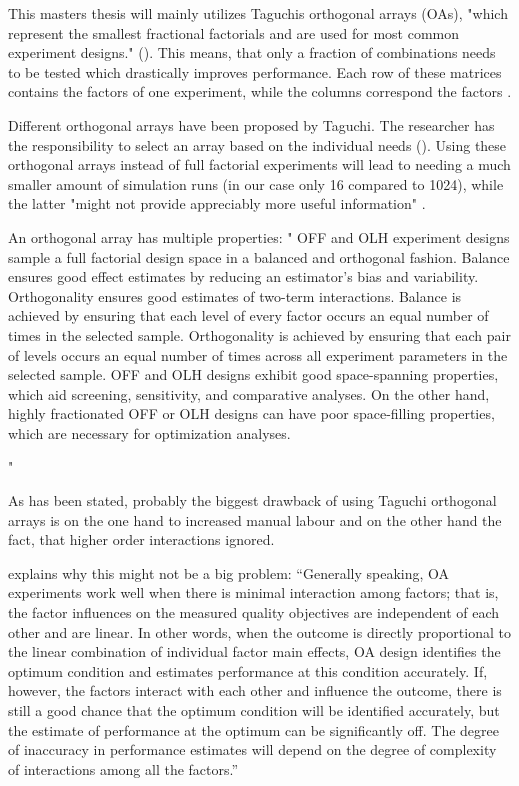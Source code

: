 This masters thesis will mainly utilizes Taguchis orthogonal arrays (OAs), "which represent the smallest fractional factorials and are used for most common experiment designs." (\cite{roy_primer_1990}). This means, that only a fraction of combinations needs to be tested which drastically improves performance. Each row of these matrices contains the factors of one experiment, while the columns correspond the factors \cite{li_taguchi_2021}. 

Different orthogonal arrays have been proposed by Taguchi. The researcher has the responsibility to select an array based on the individual needs (\cite{li_taguchi_2021}).
Using these orthogonal arrays instead of full factorial experiments will lead to needing a much smaller amount of simulation runs (in our case only 16 compared to 1024), while the latter "might not provide appreciably more useful information" \cite{roy_primer_1990}.


An orthogonal array has multiple properties:
"
OFF and OLH experiment designs sample a full factorial design space in a balanced and orthogonal fashion. Balance ensures good effect estimates by reducing an estimator’s bias and variability. Orthogonality ensures good estimates of two-term interactions. Balance is achieved by ensuring that each level of every factor occurs an equal number of times in the selected sample. Orthogonality is achieved by ensuring that each pair of levels occurs an equal number of times across all experiment parameters in the selected sample. OFF and OLH designs exhibit good space-spanning properties, which aid screening, sensitivity, and comparative analyses. On the other hand, highly fractionated OFF or OLH designs can have poor space-filling properties, which are necessary for optimization analyses.

"\cite{mills_determining_2015}





As has been stated, probably the biggest drawback of using Taguchi orthogonal arrays is on the one hand to increased manual labour and on the other hand the fact, that higher order interactions ignored.

\cite{roy_primer_1990} explains why this might not be a big problem:
\enquote{Generally speaking, OA experiments work well when there is minimal interaction among factors; that is, the factor influences on the measured quality objectives are independent of each other and are linear. In other words, when the outcome is directly proportional to the linear combination of individual factor main effects, OA design identifies the optimum condition and estimates performance at this condition accurately. If, however, the factors interact with each other and influence the outcome, there is still a good chance that the optimum condition will be identified accurately, but the estimate of performance at the optimum can be significantly off. The degree of inaccuracy in performance estimates will depend on the degree of complexity of interactions among all the factors.}

